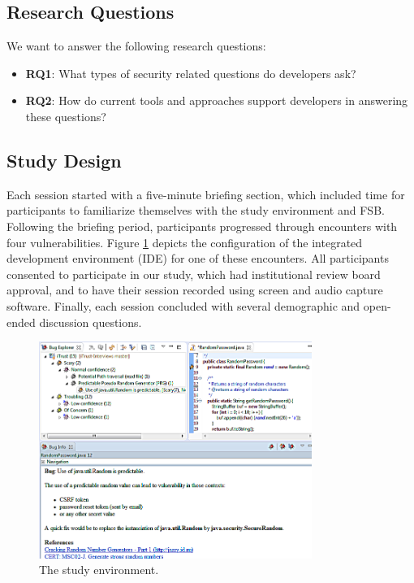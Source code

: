 \documentclass{acm_proc_article-sp}
\newcommand{\compresslist}{
	\vspace{-1em}
	\setlength{\itemsep}{1pt}
	\setlength{\parskip}{0pt}
	\setlength{\parsep}{0pt}
}
\begin{document}
\subsection{Research Questions}
\label{rqs}
We want to answer the following research questions:
\begin{itemize}
\compresslist
\item \textbf{RQ1}: What types of security related questions do developers ask?
\item \textbf{RQ2}: How do current tools and approaches support developers in answering these questions?
\end{itemize}


\subsection{Study Design}
\label{studyDesign}
Each session started with a five-minute briefing section, which included time for participants to familiarize themselves with the study environment and FSB.
Following the briefing period, participants progressed through encounters with four vulnerabilities. 
Figure \ref{fig:environment} depicts the configuration of the integrated development environment (IDE) for one of these encounters.
All participants consented to participate in our study, which had institutional review board approval, and to have their session recorded using screen and audio capture software.
Finally, each session concluded with several demographic and open-ended discussion questions.

\begin{figure}
	\centering
	\includegraphics[width=3.5in]{Images/environment.png}
	\caption{The study environment.}
	\label{fig:environment} 
\end{figure}
\end{document}
